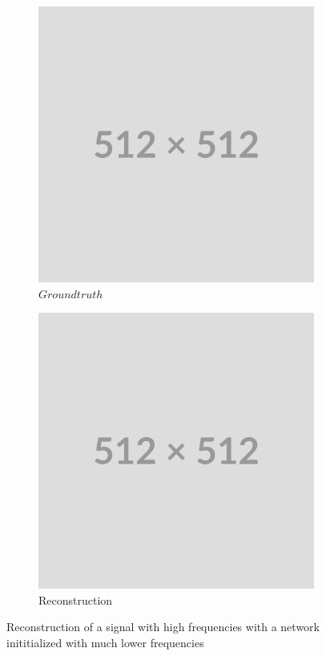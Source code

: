 \begin{figure}
    \centering
    \begin{subfigure}[b]{0.3\textwidth}
        \centering
        \includegraphics[width=\textwidth]{img/placeholder512.png}
        \caption{$Ground truth$}
        \label{fig:gt-noise1}
    \end{subfigure}
    \hfill
    \begin{subfigure}[b]{0.3\textwidth}
        \centering
        \includegraphics[width=\textwidth]{img/placeholder512.png}
        \caption{Reconstruction}
        \label{fig:rec-smooth-noise1}
    \end{subfigure}
    \hfill
    \caption{Reconstruction of a signal with high frequencies with a network inititialized with much lower frequencies}


\end{figure}

